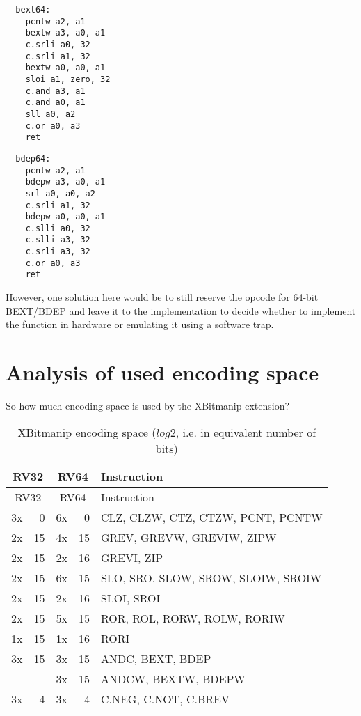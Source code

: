 \begin{multicols}{2}
\begin{minipage}{\linewidth}
\begin{verbatim}
  bext64:
    pcntw a2, a1
    bextw a3, a0, a1
    c.srli a0, 32
    c.srli a1, 32
    bextw a0, a0, a1
    sloi a1, zero, 32
    c.and a3, a1
    c.and a0, a1
    sll a0, a2
    c.or a0, a3
    ret
\end{verbatim}
\end{minipage}

\begin{minipage}{\linewidth}
\begin{verbatim}
  bdep64:
    pcntw a2, a1
    bdepw a3, a0, a1
    srl a0, a0, a2
    c.srli a1, 32
    bdepw a0, a0, a1
    c.slli a0, 32
    c.slli a3, 32
    c.srli a3, 32
    c.or a0, a3
    ret
\end{verbatim}
\end{minipage}
\end{multicols}

However, one solution here would be to still reserve the opcode for 64-bit
BEXT/BDEP and leave it to the implementation to decide whether to implement the
function in hardware or emulating it using a software trap.

\section{Analysis of used encoding space}

So how much encoding space is used by the XBitmanip extension?

\begin{longtable}[c]{@{}rr|rr|l@{}}
\caption{XBitmanip encoding space ($log2$, i.e. in equivalent number of bits)}\tabularnewline
\toprule
\multicolumn{2}{c}{RV32} & \multicolumn{2}{c}{RV64} & Instruction\tabularnewline
\midrule
\endfirsthead
\toprule
\multicolumn{2}{c}{RV32} & \multicolumn{2}{c}{RV64} & Instruction\tabularnewline
\midrule
\endhead
3x &  0 & 6x &  0 & CLZ, CLZW, CTZ, CTZW, PCNT, PCNTW\tabularnewline
\midrule
2x & 15 & 4x & 15 & GREV, GREVW, GREVIW, ZIPW\tabularnewline
2x & 15 & 2x & 16 & GREVI, ZIP\tabularnewline
\midrule
2x & 15 & 6x & 15 & SLO, SRO, SLOW, SROW, SLOIW, SROIW\tabularnewline
2x & 15 & 2x & 16 & SLOI, SROI\tabularnewline
\midrule
2x & 15 & 5x & 15 & ROR, ROL, RORW, ROLW, RORIW\tabularnewline
1x & 15 & 1x & 16 & RORI\tabularnewline
\midrule
3x & 15 & 3x & 15 & ANDC, BEXT, BDEP\tabularnewline
   &    & 3x & 15 & ANDCW, BEXTW, BDEPW\tabularnewline
\midrule
3x &  4 & 3x &  4 & C.NEG, C.NOT, C.BREV\tabularnewline
\bottomrule
\end{longtable}

